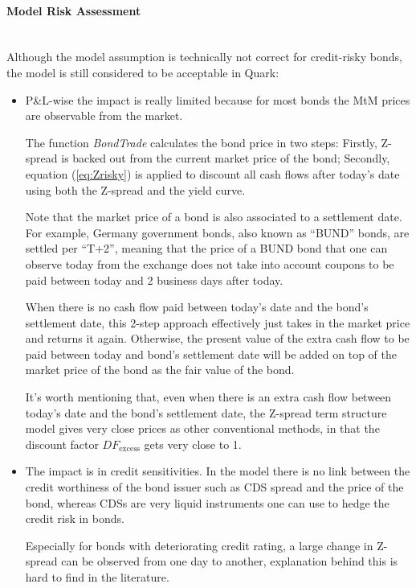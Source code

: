 \documentclass[reviewdoc]{pmv_report}  %
\begin{document}
\paragraph{Model Risk Assessment} \mbox{}\\
Although the model assumption is technically not correct for credit-risky bonds, the model is still considered to be acceptable in Quark:
\begin{itemize}
\item[-] P\&L-wise the impact is really limited because for most bonds the MtM prices are observable from the market.

The function \textit{BondTrade} calculates the bond price in two steps: Firstly, Z-spread is  backed out from
the current market price of the bond; Secondly, equation (\ref{eq:Zrisky}) is applied to discount all cash flows
 after today's date using both the Z-spread and the yield curve.

Note that the market price of a bond is also associated to a settlement date.
For example, Germany government bonds, also known as ``BUND'' bonds, are settled per ``T+2'', meaning that the price of a BUND bond that one can observe today from the exchange does not take into account coupons to be paid between today and 2 business days after today.

When there is no cash flow paid between today's date and the bond's settlement date, this 2-step approach effectively just takes in the market price and returns it again. Otherwise, the present value of the extra cash flow to be paid between today and bond's settlement date will be added on top of the market price of the bond as the fair value of the bond.

It's worth mentioning that, even when there is an extra cash flow between today's date and the bond's settlement date, the Z-spread term structure model gives very close prices as other conventional methods, in that the discount
factor $DF_{\text{excess}}$  gets very close to 1.

\item[-] The impact is in credit sensitivities.
In the model there is no link between the credit worthiness of the bond issuer such as CDS spread and the price of the bond, whereas CDSs are very liquid instruments one can use to hedge the credit risk in bonds.

Especially for bonds with deteriorating credit rating, a large change in Z-spread can be observed from one day to another, explanation behind this is hard to find in the literature.


\end{itemize}
\end{document}
